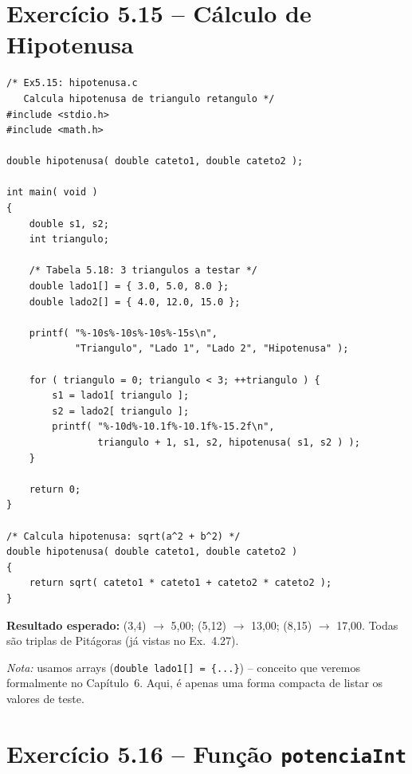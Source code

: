 \documentclass[12pt,a4paper]{article}
\begin{document}
\newpage

\section{Exercício 5.15 -- Cálculo de Hipotenusa}

\begin{respostabox}
\begin{lstlisting}
/* Ex5.15: hipotenusa.c
   Calcula hipotenusa de triangulo retangulo */
#include <stdio.h>
#include <math.h>

double hipotenusa( double cateto1, double cateto2 );

int main( void )
{
    double s1, s2;
    int triangulo;

    /* Tabela 5.18: 3 triangulos a testar */
    double lado1[] = { 3.0, 5.0, 8.0 };
    double lado2[] = { 4.0, 12.0, 15.0 };

    printf( "%-10s%-10s%-10s%-15s\n",
            "Triangulo", "Lado 1", "Lado 2", "Hipotenusa" );

    for ( triangulo = 0; triangulo < 3; ++triangulo ) {
        s1 = lado1[ triangulo ];
        s2 = lado2[ triangulo ];
        printf( "%-10d%-10.1f%-10.1f%-15.2f\n",
                triangulo + 1, s1, s2, hipotenusa( s1, s2 ) );
    }

    return 0;
}

/* Calcula hipotenusa: sqrt(a^2 + b^2) */
double hipotenusa( double cateto1, double cateto2 )
{
    return sqrt( cateto1 * cateto1 + cateto2 * cateto2 );
}
\end{lstlisting}

\textbf{Resultado esperado:} (3,4) $\to$ 5,00; (5,12) $\to$ 13,00; (8,15) $\to$ 17,00.
Todas são triplas de Pitágoras (já vistas no Ex.~4.27).

\textit{Nota:} usamos arrays (\texttt{double lado1[] = \{...\}}) -- conceito que
veremos formalmente no Capítulo~6. Aqui, é apenas uma forma compacta de listar
os valores de teste.
\end{respostabox}

\section{Exercício 5.16 -- Função \texttt{potenciaInt}}
\end{document}
